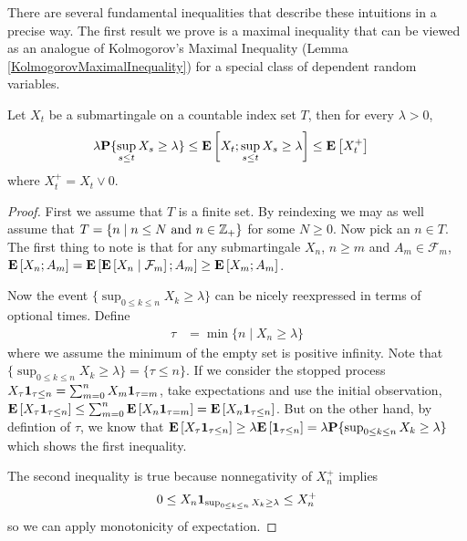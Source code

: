 There are several fundamental inequalities that describe
these intuitions in a precise way.  The first result we prove is a maximal
inequality that can be viewed as an analogue of Kolmogorov's Maximal
Inequality (Lemma \ref{KolmogorovMaximalInequality}) for a special
class of dependent random variables.
\begin{lem}\label{DoobMaximalInequalityDiscrete}Let $X_t$ be a
  submartingale on a countable index set $T$, then for every $\lambda > 0$, 
\begin{align*}
\lambda \probability{\sup_{s \leq t} X_s \geq \lambda} &\leq
\expectation{X_t ; \sup_{s \leq t} X_s  \geq \lambda} \leq \expectation{X_t^+}
\end{align*}
where $X_t^+ = X_t \vee 0$.
\end{lem}
\begin{proof}
First we assume that $T$ is a finite set.  By reindexing we may as
well assume that $T = \lbrace n \mid n \leq N \text{ and } n \in
\integers_+ \rbrace$ for some $N \geq 0$.  Now pick an $n \in T$.
The first thing to note is that for any submartingale $X_n$, $n\geq m$ and $A_m
\in \mathcal{F}_m$, $\expectation{X_n ; A_m} =
\expectation{\cexpectationlong{\mathcal{F}_m}{X_n} ; A_m}
\geq \expectation{X_m ; A_m}$.

Now the event $\lbrace \sup_{0 \leq k \leq n} X_k \geq \lambda
\rbrace$ can be nicely reexpressed in terms of optional times.  Define
\begin{align*}
\tau &= \min \lbrace  n \mid X_n \geq \lambda \rbrace
\end{align*}
where we assume the minimum of the empty set is positive infinity. 
Note that $\lbrace \sup_{0 \leq k \leq n} X_k \geq \lambda
\rbrace = \lbrace \tau \leq n \rbrace$.  If we consider the stopped
process $X_\tau \characteristic{\tau \leq n} = \sum_{m=0}^n X_m
\characteristic{\tau = m}$, take expectations and use the initial
observation,
$\expectation{X_\tau \characteristic{\tau \leq n}} \leq \sum_{m=0}^n
\expectation{X_n \characteristic{\tau = m}} = \expectation {X_n
  \characteristic{\tau \leq n}}$.  But on the other hand, by defintion
of $\tau$, we know that $\expectation{X_\tau \characteristic{\tau \leq
    n}} \geq \lambda \expectation{\characteristic{\tau \leq n}} =
\lambda \probability{\sup_{0 \leq k \leq n} X_k \geq \lambda}$ which
shows the first inequality.

The second inequality is true because nonnegativity of $X_n^+$ implies 
\begin{align*}
0 \leq X_n
\characteristic{\sup_{0 \leq k \leq n} X_k \geq \lambda} \leq X_n^+
\end{align*} so we can apply
monotonicity of expectation.


\end{proof}
